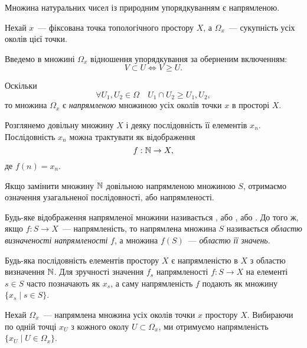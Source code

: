 \begin{example}
    Множина натуральних чисел із природним упорядкуванням є напрямленою.
\end{example}

\begin{example}
    Нехай $x$~--- фіксована точка топологічного простору $X$, а $\Omega_x$~--- сукупність усіх околів цієї точки. 

    Введемо в множині $\Omega_x$ відношення упорядкування за оберненим включенням:
    \begin{equation*}
        V \subset U \iff V \ge U.
    \end{equation*}

    Оскільки
    \begin{equation*}
        \forall U_1, U_2 \in \Omega \quad U_1 \cap U_2 \ge U_1, U_2, 
    \end{equation*}
    то множина $\Omega_x$ є \emph{напрямленою} множиною усіх околів точки $x$ в просторі $X$.
\end{example}

Розглянемо довільну множину $X$ і деяку послідовність її елементів $x_n$. Послідовність $x_n$ можна трактувати як відображення
\begin{equation*}
    f: \mathbb{N} \to X,
\end{equation*}
де $f(n) = x_n$. 

Якщо замінити множину $\mathbb{N}$ довільною напрямленою множиною $S$, отримаємо означення узагальненої послідовності, або напрямленості.

\begin{definition}
    Будь-яке відображення напрямленої множини називається , або , або . До того ж, якщо $f: S \to X$~--- напрямленість, то напрямлена множина $S$ називається \emph{областю визначеності напрямленості} $f$, а множина $f(S)$~--- \emph{областю її значень}.
\end{definition}

\begin{remark}
    Будь-яка послідовність елементів простору $X$ є напрямленістю в $X$ з областю визначення $\mathbb{N}$. Для зручності значення $f_s$ напрямленості $f: S \to X$ на елементі $s \in S$ часто позначають як $x_s$, а саму напрямленість $f$ подають як множину $\{x_s \mid s \in S\}$.
\end{remark}

\begin{example}
    Нехай $\Omega_x$~--- напрямлена множина усіх околів точки $x$ простору $X$. Вибираючи по одній точці $x_U$ з кожного околу $U \subset \Omega_x$, ми отримуємо напрямленість $\{x_U \mid U \in \Omega_x\}$.
\end{example}

